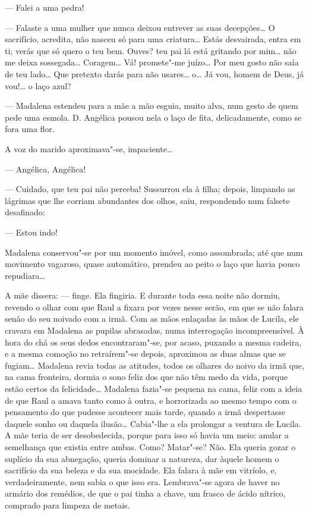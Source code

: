 --- Falei a uma pedra!

--- Falaste a uma mulher que nunca deixou entrever as suas decepções\ldots{}
O sacrifício, acredita, não nasceu só para uma criatura\ldots{} Estás
desvairada, entra em ti; verás que só quero o teu bem. Ouves? teu pai lá
está gritando por mim\ldots{} não me deixa sossegada\ldots{} Coragem\ldots{} Vá!
promete"-me juízo\ldots{} Por meu gosto não saía de teu lado\ldots{} Que pretexto
darás para não usares\ldots{} o\ldots{} Já vou, homem de Deus, já vou!\ldots{} o laço
azul?

--- Madalena estendeu para a mãe a mão esguia, muito alva, num gesto de
quem pede uma esmola. D. Angélica pousou nela o laço de fita,
delicadamente, como se fora uma flor.

A voz do marido aproximava"-se, impaciente\ldots{}

--- Angélica, Angélica!

--- Cuidado, que teu pai não perceba! Sussurrou ela à filha; depois,
limpando as lágrimas que lhe corriam abundantes dos olhos, saiu,
respondendo num falsete desafinado:

--- Estou indo!

Madalena conservou"-se por um momento imóvel, como assombrada; até que
num movimento vagaroso, quase automático, prendeu ao peito o laço que
havia pouco repudiara\ldots{}

A mãe dissera: --- finge. Ela fingiria. E durante toda essa noite não
dormiu, revendo o olhar com que Raul a fixara por vezes nesse serão, em
que se não falara senão do seu noivado com a irmã. Com as mãos enlaçadas
às mãos de Lucila, ele cravara em Madalena as pupilas abrasadas, numa
interrogação incompreensível. À hora do chá os seus dedos
encontraram"-se, por acaso, puxando a mesma cadeira, e a mesma comoção no
retraírem"-se depois, aproximou as duas almas que se fugiam\ldots{} Madalena
revia todas as atitudes, todos os olhares do noivo da irmã que, na cama
fronteira, dormia o sono feliz dos que não têm medo da vida, porque
estão certos da felicidade\ldots{} Madalena fazia"-se pequena na cama, feliz
com a ideia de que Raul a amava tanto como à outra, e horrorizada ao
mesmo tempo com o pensamento do que pudesse acontecer mais tarde, quando
a irmã despertasse daquele sonho ou daquela ilusão\ldots{} Cabia"-lhe a ela
prolongar a ventura de Lucila. A mãe teria de ser desobedecida, porque
para isso só havia um meio: anular a semelhança que existia entre ambas.
Como? Matar"-se? Não. Ela queria gozar o suplício da sua abnegação,
queria dominar a natureza, dar àquele homem o sacrifício da sua beleza e
da sua mocidade. Ela falara à mãe em vitríolo, e, verdadeiramente, nem
sabia o que isso era. Lembrava"-se agora de haver no armário dos
remédios, de que o pai tinha a chave, um frasco de ácido nítrico,
comprado para limpeza de metais.

